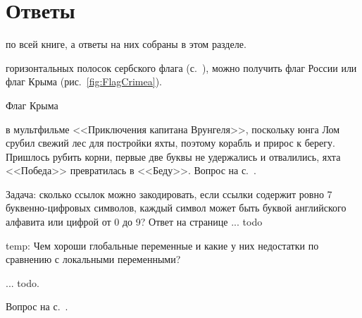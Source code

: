\chapter{Ответы}
\label{ch:answers}

 по всей книге, а ответы на них собраны в этом разделе.

\begin{task}
    \label{answer:Tricolor-flags}
     горизонтальных полосок 
    сербского флага (с.~\pageref{fig:Srpska}), можно получить флаг России 
    или флаг Крыма (рис.~\ref{fig:FlagCrimea}). 
\end{task}

\begin{marginfigure}[0cm]
{%
\setlength{\fboxsep}{0pt}%
\setlength{\fboxrule}{1pt}%
%
}%
\caption{Флаг Крыма}
\label{fig:FlagCrimea}
\end{marginfigure}

\begin{task}
    \label{answer:Pobeda-beda}
     в мультфильме <<Приключения капитана 
    Врунгеля>>, поскольку юнга Лом срубил свежий лес для постройки яхты, поэтому корабль 
    и прирос к берегу. Пришлось рубить корни, первые две буквы не удержались и отвалились, 
    яхта <<Победа>> превратилась в <<Беду>>. 
    \small{Вопрос на с.~\pageref{fig:Pobeda-beda}.}
\end{task}

Задача: сколько ссылок можно закодировать, если ссылки содержит ровно 7 буквенно-цифровых символов,
     каждый символ может быть буквой английского алфавита 
     или цифрой от 0 до 9? Ответ на странице ... todo 

temp: Чем хороши глобальные переменные и какие у них недостатки
по сравнению с локальными переменными?

\begin{task}
    \label{answer:global-vars-pros-cons}
     ... todo. 

    \small{Вопрос на с.~\pageref{fig:block:proc:swap:colors}.}
\end{task}

